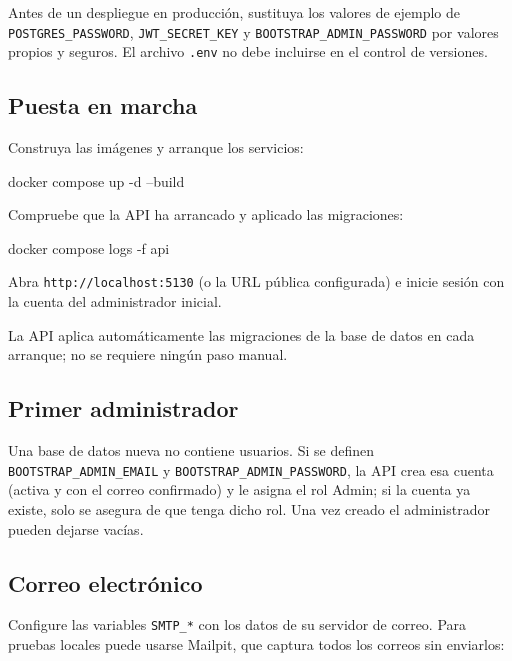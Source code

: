 \documentclass[11pt,a4paper]{article}
\begin{document}
\begin{warnbox}
Antes de un despliegue en producción, sustituya los valores de ejemplo de
\texttt{POSTGRES\_PASSWORD}, \texttt{JWT\_SECRET\_KEY} y
\texttt{BOOTSTRAP\_ADMIN\_PASSWORD} por valores propios y seguros. El archivo
\texttt{.env} no debe incluirse en el control de versiones.
\end{warnbox}

\subsection{Puesta en marcha}

\begin{pasos}
  \item Construya las imágenes y arranque los servicios:
\begin{consola}
docker compose up -d --build
\end{consola}
  \item Compruebe que la API ha arrancado y aplicado las migraciones:
\begin{consola}
docker compose logs -f api
\end{consola}
  \item Abra \texttt{http://localhost:5130} (o la URL pública configurada) e
  inicie sesión con la cuenta del administrador inicial.
\end{pasos}

La API aplica automáticamente las migraciones de la base de datos en cada arranque;
no se requiere ningún paso manual.

\subsection{Primer administrador}

Una base de datos nueva no contiene usuarios. Si se definen
\texttt{BOOTSTRAP\_ADMIN\_EMAIL} y \texttt{BOOTSTRAP\_ADMIN\_PASSWORD}, la API crea
esa cuenta (activa y con el correo confirmado) y le asigna el rol Admin; si la
cuenta ya existe, solo se asegura de que tenga dicho rol. Una vez creado el
administrador pueden dejarse vacías.

\subsection{Correo electrónico}

Configure las variables \texttt{SMTP\_*} con los datos de su servidor de correo.
Para pruebas locales puede usarse Mailpit, que captura todos los correos sin
enviarlos:
\end{document}

